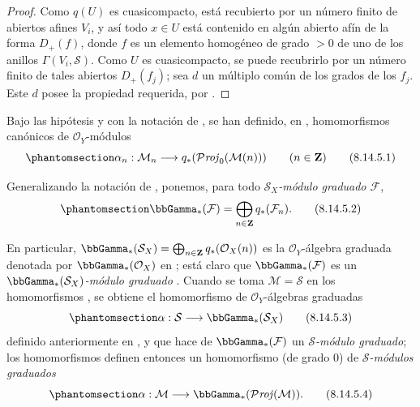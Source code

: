 \documentclass[oneside,10pt]{amsart}
\makeatletter
\newcommand{\ega@arrow}[2]{\mathchoice{#1}{#2}{#2}{#2}}
\renewcommand{\to}{\ega@arrow{\longrightarrow}{\rightarrow}}
\newcommand{\oldpage}[2][]{\marginnote{\normalfont\footnotesize\textbf{#1}~|~#2}\ignorespaces}
\let\EGAOriginalLabel\label
\renewcommand{\label}[1]{\phantomsection\EGAOriginalLabel{#1}}
\makeatother
\begin{document}
\begin{proof}
Como $q(U)$ es cuasicompacto, está recubierto por un número finito de abiertos afines $V_i$, y así todo $x\in U$ está contenido en algún abierto afín de la forma $D_+(f)$, donde $f$ es un elemento homogéneo de grado $>0$ de uno de los anillos $\Gamma(V_i,\mathcal{S})$.
Como $U$ es cuasicompacto, se puede recubrirlo por un número finito de tales abiertos $D_+(f_j)$;
sea $d$ un múltiplo común de los grados de los $f_j$.
Este $d$ posee la propiedad requerida, por .
\end{proof}

\begin{env}[8.14.5]
\label{II.8.14.5-fr}
Bajo las hipótesis y con la notación de , se han definido, en , homomorfismos canónicos de $\mathcal{O}_Y$-módulos
\begin{equation}
\label{II.8.14.5.1-fr}
  \alpha_n:\mathcal{M}_n\to
  q_*(\mathcal{P}\mathit{roj}_0(\mathcal{M}(n)))
  \qquad(n\in\mathbf{Z})
\tag{8.14.5.1}
\end{equation}

Generalizando la notación de , ponemos, para todo \emph{$\mathcal{S}_X$-módulo graduado $\mathcal{F}$},
\begin{equation}
\label{II.8.14.5.2-fr}
  \bbGamma_*(\mathcal{F})=
  \bigoplus_{n\in\mathbf{Z}}q_*(\mathcal{F}_n).
\tag{8.14.5.2}
\end{equation}

En particular, $\bbGamma_*(\mathcal{S}_X)=\bigoplus_{n\in\mathbf{Z}}q_*(\mathcal{O}_X(n))$ es la $\mathcal{O}_Y$-álgebra graduada denotada por $\bbGamma_*(\mathcal{O}_X)$ en ;
está claro que $\bbGamma_*(\mathcal{F})$ es un \emph{$\bbGamma_*(\mathcal{S}_X)$-módulo graduado} .
Cuando
\oldpage[II]{199}
se toma $\mathcal{M}=\mathcal{S}$ en los homomorfismos , se obtiene el homomorfismo de $\mathcal{O}_Y$-álgebras graduadas
\begin{equation}
\label{II.8.14.5.3-fr}
  \alpha:\mathcal{S}\to\bbGamma_*(\mathcal{S}_X)
\tag{8.14.5.3}
\end{equation}
definido anteriormente en , y que hace de $\bbGamma_*(\mathcal{F})$ un \emph{$\mathcal{S}$-módulo graduado};
los homomorfismos  definen entonces un homomorfismo (de grado $0$) de \emph{$\mathcal{S}$-módulos graduados}
\begin{equation}
\label{II.8.14.5.4-fr}
  \alpha:\mathcal{M}\to\bbGamma_*(\mathcal{P}\mathit{roj}(\mathcal{M})).
\tag{8.14.5.4}
\end{equation}
\end{env}
\end{document}
